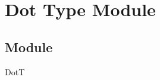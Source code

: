 \documentclass[12pt]{article}
\begin{document}










\newpage
\section* {Dot Type Module}
\subsection*{Module}
DotT
\end{document}
